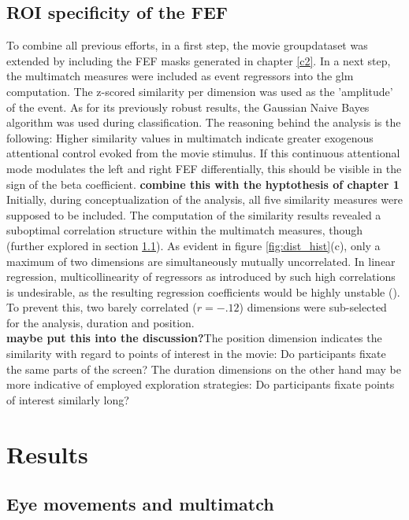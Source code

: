 \documentclass[a4paper, 12pt]{scrreprt}
\begin{document}
\subsection{ROI specificity of the FEF}\label{c3:FEF}

To combine all previous efforts, in a first step, the movie groupdataset was extended by including the FEF masks generated in chapter \ref{c2}. In a next step, the multimatch measures were included as event regressors into the glm computation. The z-scored similarity per dimension was used as the 'amplitude' of the event. As for its previously robust results, the Gaussian Naive Bayes algorithm was used during classification. The reasoning behind the analysis is the following: Higher similarity values in multimatch indicate greater exogenous attentional control evoked from the movie stimulus. If this continuous attentional mode modulates the left and right FEF differentially, this should be visible in the sign of the beta coefficient. \textbf{combine this with the hyptothesis of chapter 1} Initially, during conceptualization of the analysis, all five similarity measures were supposed to be included. The computation of the similarity results revealed a suboptimal correlation structure within the multimatch measures, though (further explored in section \ref{sec:res_mm}). As evident in figure \ref{fig:dist_hist}(c), only a maximum of two dimensions are simultaneously mutually uncorrelated. In linear regression, multicollinearity of regressors as introduced by such high correlations is undesirable, as the resulting regression coefficients would be highly unstable (\cite{wickens2014geometry}). To prevent this, two barely correlated ($r = -.12$) dimensions were sub-selected for the analysis, duration and position.  \\
\textbf{maybe put this into the discussion?}The position dimension indicates the similarity with regard to points of interest in the movie: Do participants fixate the same parts of the screen? The duration dimensions on the other hand may be more indicative of employed exploration strategies: Do participants fixate points of interest similarly long?


\section{Results}

\subsection{Eye movements and multimatch}\label{sec:res_mm}
\end{document}
